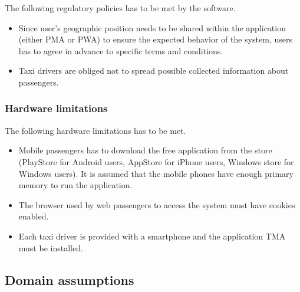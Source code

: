 The following regulatory policies has to be met by the software.
\begin{itemize}
\item Since user's geographic position needs to be shared within the application
(either PMA or PWA) to ensure the expected behavior of the system,
users has to agree in advance to specific terms and conditions. 
\item Taxi drivers are obliged not to spread possible collected information
about passengers.
\end{itemize}

\subsubsection{Hardware limitations }

The following hardware limitations has to be met.
\begin{itemize}
\item Mobile passengers has to download the free application from the store
(PlayStore for Android users, AppStore for iPhone users, Windows store
for Windows users). It is assumed that the mobile phones have enough
primary memory to run the application.
\item The browser used by web passengers to access the system must have
cookies enabled.
\item Each taxi driver is provided with a smartphone and the application
TMA must be installed.
\end{itemize}

\subsection{Domain assumptions}

